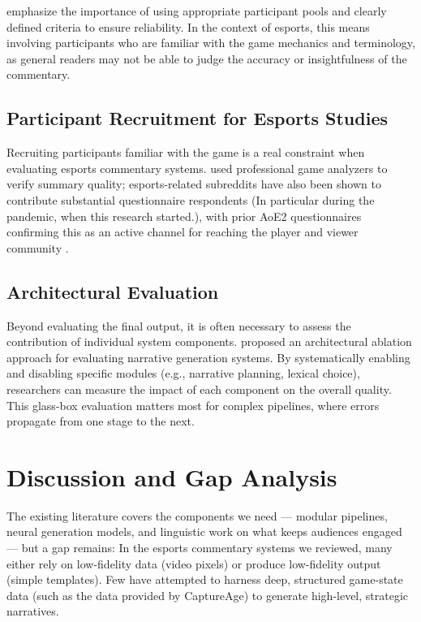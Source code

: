 \noindent {} emphasize the importance of using appropriate participant pools and clearly defined criteria to ensure reliability. In the context of esports, this means involving participants who are familiar with the game mechanics and terminology, as general readers may not be able to judge the accuracy or insightfulness of the commentary.

\subsection{Participant Recruitment for Esports Studies}
Recruiting participants familiar with the game is a real constraint when evaluating esports commentary systems. \citet{lux2019a} used professional game analyzers to verify summary quality; esports-related subreddits have also been shown to contribute substantial questionnaire respondents \cite{hamari2017} (In particular during the pandemic, when this research started.), with prior AoE2 questionnaires confirming this as an active channel for reaching the player and viewer community \cite{bidermayer2020}.

\subsection{Architectural Evaluation}
Beyond evaluating the final output, it is often necessary to assess the contribution of individual system components. \citet{callaway2002} proposed an architectural ablation approach for evaluating narrative generation systems. By systematically enabling and disabling specific modules (e.g., narrative planning, lexical choice), researchers can measure the impact of each component on the overall quality. This glass-box evaluation matters most for complex pipelines, where errors propagate from one stage to the next.

\section{Discussion and Gap Analysis}
The existing literature covers the components we need — modular pipelines, neural generation models, and linguistic work on what keeps audiences engaged — but a gap remains:
In the esports commentary systems we reviewed, many either rely on low-fidelity data (video pixels) or produce low-fidelity output (simple templates). Few have attempted to harness deep, structured game-state data (such as the data provided by CaptureAge) to generate high-level, strategic narratives.

